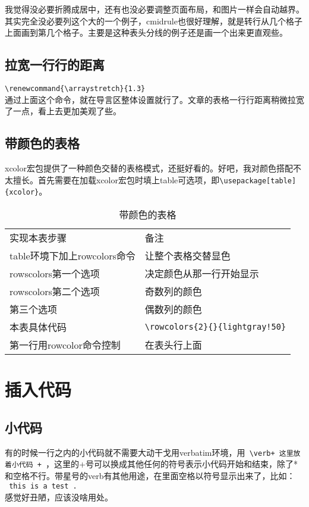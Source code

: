 我觉得没必要折腾成居中，还有也没必要调整页面布局，和图片一样会自动越界。其实完全没必要列这个大的一个例子，cmidrule也很好理解，就是转行从几个格子上面画到第几个格子。主要是这种表头分线的例子还是画一个出来更直观些。

\subsection{拉宽一行行的距离}
\verb+\renewcommand{\arraystretch}{1.3}+\\
通过上面这个命令，就在导言区整体设置就行了。文章的表格一行行距离稍微拉宽了一点，看上去更加美观了些。


\subsection[带颜色的表格]{带颜色的表格}
\label{sec:带颜色的表格}
xcolor宏包提供了一种颜色交替的表格模式，还挺好看的。好吧，我对颜色搭配不太擅长。首先需要在加载xcolor宏包时填上table可选项，即\verb+\usepackage[table]{xcolor}+。
\begin{table}[h]

\centering
\begin{tabular}{@{}ll@{}}
\rowcolor{lightgray!20}
实现本表步骤        &     备注         \\ 
table环境下加上rowcolors命令        & 让整个表格交替显色           \\
rowscolors第一个选项              & 决定颜色从那一行开始显示              \\
rowscolors第二个选项            & 奇数列的颜色  \\
第三个选项  & 偶数列的颜色 \\
本表具体代码    & \verb+\rowcolors{2}{}{lightgray!50}+     \\
第一行用rowcolor命令控制       & 在表头行上面           
\end{tabular}
\caption{带颜色的表格}
\label{tab:带颜色的表格}

\end{table}


\section{插入代码}
\subsection{小代码}
有的时候一行之内的小代码就不需要大动干戈用verbatim环境，用\verb| \verb+ 这里放着小代码 + |，这里的+号可以换成其他任何的符号表示小代码开始和结束，除了*和空格不行。带星号的verb有其他用途，在里面空格以符号显示出来了，比如：\\
\verb*| this is a test . | \\感觉好丑陋，应该没啥用处。

